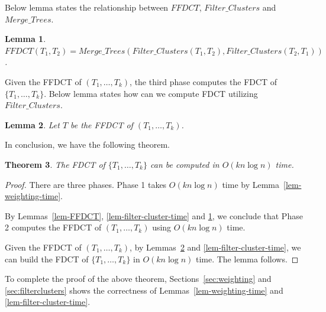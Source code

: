\documentclass[final,1p,times]{elsarticle}
\newtheorem{theorem}{Theorem}
\newtheorem{lemma}[theorem]{Lemma}
\begin{document}
    Below lemma states the relationship between $FFDCT$, $Filter\_Clusters$ and $Merge\_Trees$.
    \begin{lemma}
	    \label{lem-FFDCT-merge-filter}
	    $FFDCT(T_1, T_2) = Merge\_Trees( Filter\_Clusters(T_1, T_2), Filter\_Clusters(T_2, T_1) )$.
    \end{lemma}


    Given the FFDCT of $(T_1, \ldots, T_k)$, the third phase computes the FDCT of $\{ T_1, \ldots, T_k \}$. Below lemma states how can we compute FDCT utilizing $Filter\_Clusters$.
    \begin{lemma}
	    \label{lem-FDCT}
	    Let $T$ be the FFDCT of $(T_1, \ldots, T_k)$.

    \end{lemma}



    In conclusion, we have the following theorem.
    \begin{theorem}
    The FDCT of $\{T_1, \ldots, T_k\}$ can be computed in $O(kn \log n)$ time.
    \end{theorem}
    \begin{proof}
	    There are three phases.
	    Phase 1 takes $O(k n \log n)$ time by Lemma~\ref{lem-weighting-time}.

	    By Lemmas~\ref{lem-FFDCT}, \ref{lem-filter-cluster-time} and \ref{lem-FFDCT-merge-filter}, we conclude that Phase 2 computes the FFDCT of $(T_1, \ldots, T_k)$ using $O(k n \log n)$ time.


	    Given the FFDCT of $(T_1, \ldots, T_k)$, by Lemmas~\ref{lem-FDCT} and \ref{lem-filter-cluster-time}, we can build the FDCT of $\{T_1, \ldots, T_k\}$ in $O(kn \log n)$ time.
	    The lemma follows.
    \end{proof}

    To complete the proof of the above theorem, Sections~\ref{sec:weighting} and \ref{sec:filterclusters} shows the correctness of Lemmas~\ref{lem-weighting-time} and \ref{lem-filter-cluster-time}.

\end{document}
